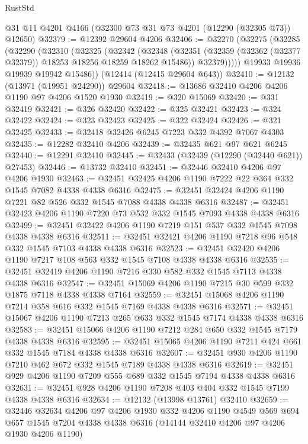 \begin{lexlean}{RustStd}
\begin{coremodule}
{\begin{coremodule}
{{{{{{{{{{{{{{{{{{{{{{{{{{{{{{{{{{{{{{{{{{{{{{{{{{    @31
    @11
    @4201
    @4166
    (@32300 @73 @31 @73 @4201 (@12290 (@32305 @73)) @12650)
@32379 := @12392 @29604 @4206
@32406 := @32270
    (@32275
      (@32285
        (@32290
          (@32310
            (@32325
              (@32342
                (@32348
                  (@32351 (@32359 (@32362 (@32377 @32379)) @18253 @18256 @18259 @18262 @15486))
                  @32379)))))
        @19933
        @19936
        @19939
        @19942
        @15486))
    (@12414 (@12415 @29604 @643))
@32410 := @12132 (@13971 (@19951 @24290)) @29604
@32418 := @13686 @32410 @4206 @4206 @1190 @97 @4206 @1520 @1930
@32419 := @320 @15069
@32420 := @331 @32419
@32421 := @326 @32420
@32422 := @325 @32421
@32423 := @324 @32422
@32424 := @323 @32423
@32425 := @322 @32424
@32426 := @321 @32425
@32433 := @32418 @32426 @6245 @7223 @332 @4392 @7067 @4303
@32435 := @12282 @32410 @4206
@32439 := @32435 @621 @97 @621 @6245
@32440 := @12291 @32410
@32445 := @32433 (@32439 (@12290 (@32440 @621)) @27453)
@32446 := @13732 @32410
@32451 := @32446 @32410 @4206 @97 @4206 @1930
@32463 := @32451 @32425 @4206 @1190 @7222 @22 @364 @332 @1545 @7082 @4338 @4338 @6316
@32475 := @32451 @32424 @4206 @1190 @7221 @82 @526 @332 @1545 @7088 @4338 @4338 @6316
@32487 := @32451 @32423 @4206 @1190 @7220 @73 @532 @332 @1545 @7093 @4338 @4338 @6316
@32499 := @32451 @32422 @4206 @1190 @7219 @151 @537 @332 @1545 @7098 @4338 @4338 @6316
@32511 := @32451 @32421 @4206 @1190 @7218 @96 @548 @332 @1545 @7103 @4338 @4338 @6316
@32523 := @32451 @32420 @4206 @1190 @7217 @108 @563 @332 @1545 @7108 @4338 @4338 @6316
@32535 := @32451 @32419 @4206 @1190 @7216 @330 @582 @332 @1545 @7113 @4338 @4338 @6316
@32547 := @32451 @15069 @4206 @1190 @7215 @30 @599 @332 @1875 @7118 @4338 @4338 @7164
@32559 := @32451 @15068 @4206 @1190 @7214 @358 @616 @332 @1545 @7169 @4338 @4338 @6316
@32571 := @32451 @15067 @4206 @1190 @7213 @265 @633 @332 @1545 @7174 @4338 @4338 @6316
@32583 := @32451 @15066 @4206 @1190 @7212 @284 @650 @332 @1545 @7179 @4338 @4338 @6316
@32595 := @32451 @15065 @4206 @1190 @7211 @424 @661 @332 @1545 @7184 @4338 @4338 @6316
@32607 := @32451 @930 @4206 @1190 @7210 @462 @672 @332 @1545 @7189 @4338 @4338 @6316
@32619 := @32451 @929 @4206 @1190 @7209 @555 @689 @332 @1545 @7194 @4338 @4338 @6316
@32631 := @32451 @928 @4206 @1190 @7208 @403 @404 @332 @1545 @7199 @4338 @4338 @6316
@32634 := @12132 (@13998 @13761) @32410
@32659 := @32446
    @32634
    @4206
    @97
    @4206
    @1930
    @332
    @4206
    @1190
    @4549
    @569
    @694
    @657
    @1545
    @7204
    @4338
    @4338
    @6316
    (@14144 @32410 @4206 @97 @4206 @1930 @4206 @1190)
}}}}}}}}}}}}}}}}}}}}}}}}}}}}}}}}}}}}}}}}}}}}}}}}}}
\end{coremodule}}
\end{coremodule}
\end{lexlean}
